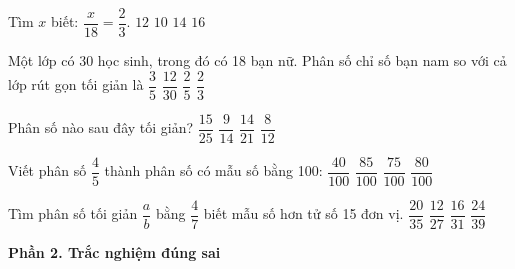 \begin{ex} %
Tìm $x$ biết: $\dfrac{x}{18} = \dfrac{2}{3}$.
\choice
{\True $12$}
{$10$}
{$14$}
{$16$}
\end{ex}

\begin{ex} %
Một lớp có 30 học sinh, trong đó có 18 bạn nữ. Phân số chỉ số bạn nam so với cả lớp rút gọn tối giản là
\choice
{$\dfrac{3}{5}$}
{$\dfrac{12}{30}$}
{\True $\dfrac{2}{5}$}
{$\dfrac{2}{3}$}
\end{ex}

\begin{ex} %
Phân số nào sau đây tối giản?
\choice
{$\dfrac{15}{25}$}
{\True $\dfrac{9}{14}$}
{$\dfrac{14}{21}$}
{$\dfrac{8}{12}$}
\end{ex}

\begin{ex} %
Viết phân số $\dfrac{4}{5}$ thành phân số có mẫu số bằng 100:
\choice
{$\dfrac{40}{100}$}
{$\dfrac{85}{100}$}
{$\dfrac{75}{100}$}
{\True $\dfrac{80}{100}$}
\end{ex}

\begin{ex} %
Tìm phân số tối giản $\dfrac{a}{b}$ bằng $\dfrac{4}{7}$ biết mẫu số hơn tử số 15 đơn vị.
\choice
{\True $\dfrac{20}{35}$}
{$\dfrac{12}{27}$}
{$\dfrac{16}{31}$}
{$\dfrac{24}{39}$}
\end{ex}

\textbf{Phần 2. Trắc nghiệm đúng sai}

